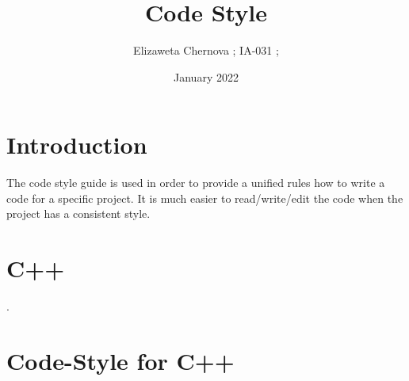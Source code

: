 \documentclass{article}
\title{Code Style}
\author{Elizaweta Chernova ; IA-031 ;}
\affil{SibSUTIS, email: elizaweta\_02@mail.ru .}
\date{January 2022}
\begin{document}
\maketitle

\section{Introduction}
The code style guide is used in order to provide a unified rules how to write a code for a specific project. It is much easier to read/write/edit the code when the project has a consistent style.
\section{C++\cite{CPP}}.
\section{Code-Style for C++\cite{CPP1} \cite{CPP2}} 
\end{document}
